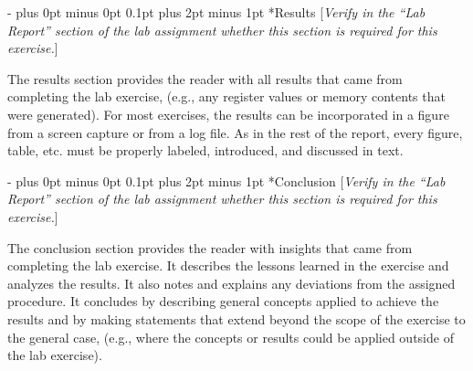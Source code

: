 \documentclass[\FontSize\FontUnit,letterpaper,oneside]{article}
\makeatletter
\renewcommand \section{
    \@startsection{section}{1}{\z@}
      {\dimexpr \FontSize\FontUnit * 2 - \parskip \relax plus 0pt minus 0pt}
      {0.1pt plus 2pt minus 1pt} %
      {\normalfont\normalsize\bfseries}}
\makeatother
\begin{document}
\section*{Results}
[\textit{Verify in the ``Lab Report'' section of the lab assignment 
  whether this section is required for this exercise.}]
\par The results section provides the reader with all results that came from 
  completing the lab exercise, (e.g., any register values or memory 
  contents that were generated).  For most exercises, the results can be 
  incorporated in a figure from a screen capture or from a log file.  
  As in the rest of the report, every figure, table, etc. must be 
  properly labeled, introduced, and discussed in text.
\section*{Conclusion}
[\textit{Verify in the ``Lab Report'' section of the lab assignment 
  whether this section is required for this exercise.}]
\par The conclusion section provides the reader with insights that came from 
  completing the lab exercise.  It describes the lessons learned in the 
  exercise and analyzes the results.  It also notes and explains any 
  deviations from the assigned procedure.  It concludes by describing 
  general concepts applied to achieve the results and by making 
  statements that extend beyond the scope of the exercise to the general 
  case, (e.g., where the concepts or results could be applied outside of 
  the lab exercise).
\label{LastPage}
\end{document}
